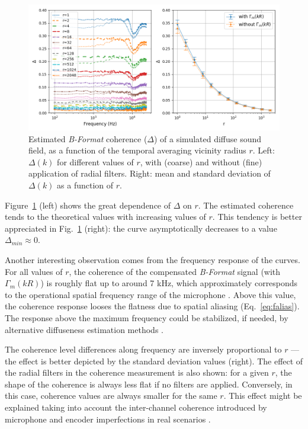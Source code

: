 \begin{figure}
	\includegraphics[width=\textwidth]{Figures/CoherenceEstimation/Figure2}
	\caption{\label{fig:Fig2} Estimated \textit{B-Format} coherence ($\Delta$) of a simulated diffuse sound field, as a function of the temporal averaging vicinity radius $r$. Left: $\Delta(k)$ for different values of $r$, with (coarse) and without (fine) application of radial filters. Right: mean and standard deviation of $\Delta(k)$ as a function of $r$.}
\end{figure}


Figure~\ref{fig:Fig2} (left) shows the great dependence of $\Delta$ on $r$.  The estimated coherence tends to the theoretical values with increasing values of $r$. This tendency is better appreciated in Fig.~\ref{fig:Fig2} (right): the curve asymptotically decreases to a value $\Delta_{min}\approx0$.

Another interesting observation comes from the frequency response of the curves. For all values of $r$, the coherence of the compensated \textit{B-Format} signal (with $\Gamma_m(kR)$) is roughly flat up to around 7 kHz, which approximately corresponds to the operational spatial frequency range of the microphone \cite{gerzon1975design}.
Above this value, the coherence response looses the flatness due to spatial aliasing (Eq.~\ref{eq:falias}). The response above the maximum frequency could be stabilized, if needed, by alternative diffuseness estimation methods \cite{politis_direction--arrival_2015}.

The coherence level differences along frequency are inversely proportional to $r$ --- the effect is better depicted by the standard deviation values (right).
The effect of the radial filters in the coherence measurement is also shown: for a given $r$, the shape of the coherence is always less flat if no filters are applied. Conversely, in this case, coherence values are always smaller for the same $r$. This effect might be explained taking into account the inter-channel coherence introduced by microphone and encoder imperfections in real scenarios \cite{schorkhuber_ambisonic_2017}.

